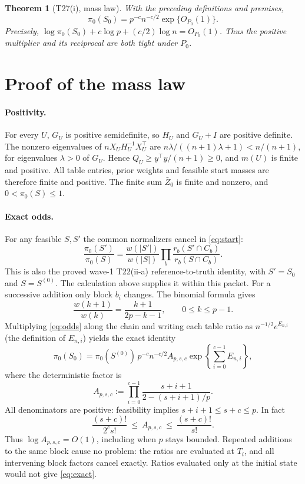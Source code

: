 ﻿\documentclass[11pt]{article}
\newtheorem{theorem}{Theorem}
\newcommand{\Op}{O_{P_0}}
\begin{document}
\begin{theorem}[T27(i), mass law]\label{thm:main}
With the preceding definitions and premises,
\[
 \boxed{\ \pi_0(S_0)=p^{-c}n^{-c/2}\exp\{\Op(1)\}.\ }
\]
Precisely, $\log\pi_0(S_0)+c\log p+(c/2)\log n=\Op(1)$. Thus the positive multiplier and its reciprocal are both tight under $P_0$.
\end{theorem}

\section{Proof of the mass law}
\paragraph{Positivity.}
For every $U$, $G_U$ is positive semidefinite, so $H_U$ and $G_U+I$ are positive definite. The nonzero eigenvalues of $nX_UH_U^{-1}X_U^\top$ are $n\lambda/((n+1)\lambda+1)<n/(n+1)$, for eigenvalues $\lambda>0$ of $G_U$. Hence $Q_U\ge y^\top y/(n+1)\ge0$, and $m(U)$ is finite and positive. All table entries, prior weights and feasible start masses are therefore finite and positive. The finite sum $\bar Z_0$ is finite and nonzero, and $0<\pi_0(S)\le1$.

\paragraph{Exact odds.}
For any feasible $S,S'$ the common normalizers cancel in \eqref{eq:start}:
\begin{equation}\label{eq:odds}
 \frac{\pi_0(S')}{\pi_0(S)}
 =\frac{w(|S'|)}{w(|S|)}
   \prod_b\frac{r_b(S'\cap C_b)}{r_b(S\cap C_b)}.
\end{equation}
This is also the proved wave-1 T22(ii-a) reference-to-truth identity, with $S'=S_0$ and $S=S^{(0)}$. The calculation above supplies it within this packet. For a successive addition only block $b_i$ changes. The binomial formula gives
\[
 \frac{w(k+1)}{w(k)}=\frac{k+1}{2p-k-1},\qquad 0\le k\le p-1.
\]
Multiplying \eqref{eq:odds} along the chain and writing each table ratio as $n^{-1/2}e^{E_{n,i}}$ (the definition of $E_{n,i}$) yields the exact identity
\begin{equation}\label{eq:exact}
 \pi_0(S_0)=\pi_0(S^{(0)})\,p^{-c}n^{-c/2}
 A_{p,s,c}\exp\!\left\{\sum_{i=0}^{c-1}E_{n,i}\right\},
\end{equation}
where the deterministic factor is
\[
 A_{p,s,c}:=\prod_{i=0}^{c-1}\frac{s+i+1}{2-(s+i+1)/p}.
\]
All denominators are positive: feasibility implies $s+i+1\le s+c\le p$. In fact
\begin{equation}\label{eq:bounded}
 \frac{(s+c)!}{2^c s!}\ \le\ A_{p,s,c}\ \le\ \frac{(s+c)!}{s!}.
\end{equation}
Thus $\log A_{p,s,c}=O(1)$, including when $p$ stays bounded. Repeated additions to the same block cause no problem: the ratios are evaluated at $T_i$, and all intervening block factors cancel exactly. Ratios evaluated only at the initial state would not give \eqref{eq:exact}.
\end{document}
